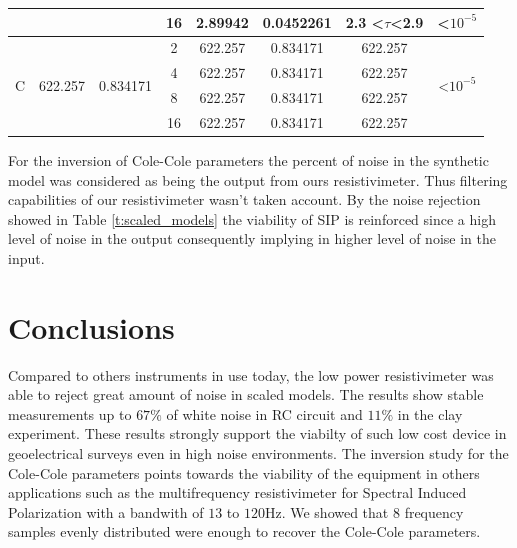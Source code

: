 \documentclass{vie16}
\begin{document}
\begin{table}[H]
\begin{adjustbox}{scale=0.9}
\begin{tabular}{@{}|c|c|c|c|c|c|c|c|@{}}
                   &                          &                            & 16                                 & 2.89942         & 0.0452261         & 2.3 \textless$\tau$\textless 2.9  & \textless $10^{-5}$                  \\ \hline
\multirow{4}{*}{C} & \multirow{4}{*}{622.257} & \multirow{4}{*}{0.834171}  & 2                                  & 622.257         & 0.834171          & 622.257                           & \multirow{4}{*}{\textless $10^{-5}$} \\
                   &                          &                            & 4                                  & 622.257         & 0.834171          & 622.257                           &                                      \\
                   &                          &                            & 8                                  & 622.257         & 0.834171          & 622.257                           &                                      \\
                   &                          &                            & 16                                 & 622.257         & 0.834171          & 622.257                           &                                   \\  \hline
\end{tabular}
\end{adjustbox}
\end{table}

For the inversion of Cole-Cole parameters the percent of noise in the
synthetic model was considered as being the output from ours
resistivimeter. Thus filtering capabilities of our resistivimeter
wasn't taken account. By the noise rejection showed in Table
\ref{t:scaled_models} the viability of SIP is reinforced since a high
level of noise in the output consequently implying in higher level of
noise in the input. 

\section{Conclusions}

Compared to others instruments in use today, the low power
resistivimeter was able to reject great amount of noise in scaled
models. The results show stable measurements up to $67\%$ of white
noise in RC circuit and $11 \%$ in the clay experiment. These results
strongly support the viabilty of such low cost device in geoelectrical
surveys even in high noise environments. The inversion study for the
Cole-Cole parameters points towards the viability of the equipment in
others applications such as the multifrequency resistivimeter for
Spectral Induced Polarization with a bandwith of $13$ to $120$Hz. We
showed that $8$ frequency samples evenly distributed were enough to
recover the Cole-Cole parameters.
\end{document}
